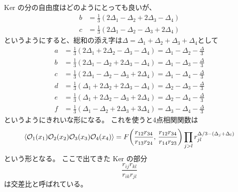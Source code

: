 \documentclass[../../master.tex]{subfiles}
\begin{document}
Ker の分の自由度はどのようにとっても良いが、
\begin{align*}
    b &= \frac{1}{3}(2\Delta_1 - \Delta_2 +2\Delta_3 - \Delta_4)\\
    c &= \frac{1}{3}(2\Delta_1 - \Delta_2 - \Delta_3 +2\Delta_4)
\end{align*}
というようにすると、総和の添え字は\(\Delta = \Delta_1 + \Delta_2 + \Delta_3 + \Delta_4\)として
\begin{align*}
    a &= \frac{1}{3}(2\Delta_1 +2\Delta_2 - \Delta_3 - \Delta_4) = \Delta_1 -\Delta_2 -\frac{\Delta}{3}\\
    b &= \frac{1}{3}(2\Delta_1 - \Delta_2 +2\Delta_3 - \Delta_4) = \Delta_1 -\Delta_3 -\frac{\Delta}{3}\\
    c &= \frac{1}{3}(2\Delta_1 - \Delta_2 - \Delta_3 +2\Delta_4) = \Delta_1 -\Delta_4 -\frac{\Delta}{3}\\
    d &= \frac{1}{3}( \Delta_1 +2\Delta_2 +2\Delta_3 - \Delta_4) = \Delta_2 -\Delta_3 -\frac{\Delta}{3}\\
    e &= \frac{1}{3}( \Delta_1 +2\Delta_2 - \Delta_3 +2\Delta_4) = \Delta_2 -\Delta_4 -\frac{\Delta}{3}\\
    f &= \frac{1}{3}( \Delta_1 - \Delta_2 +2\Delta_3 +3\Delta_4) = \Delta_3 -\Delta_4 -\frac{\Delta}{3}
\end{align*}
というようにきれいな形になる。
これを使うと4点相関関数は
\begin{equation}
    \ev{\mathcal{O}_1(x_1)\mathcal{O}_2(x_2)\mathcal{O}_3(x_3)\mathcal{O}_4(x_4)}
    =  F\qty(\frac{r_{12}r_{34}}{r_{13}r_{24}},\, \frac{r_{12}r_{34}}{r_{14}r_{23}})
    \prod_{j>l} r_{jl}^{\Delta/3-(\Delta_j+\Delta_l)}
\end{equation}
という形となる。
ここで出てきた Ker の部分
\begin{equation}
    \frac{r_{ij}r_{kl}}{r_{ik}r_{jl}}
\end{equation}
は交差比と呼ばれている。
\end{document}
